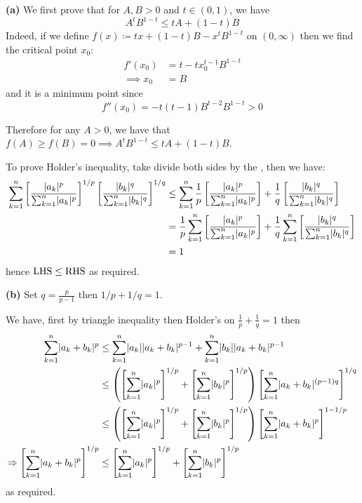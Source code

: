\documentclass[a4paper, 10pt]{article}
\begin{document}
\begin{solution}
    \textbf{(a)} We first prove that for $A, B > 0$ and $t \in (0, 1)$, we have
    \begin{equation*}
        A^t B^{1-t} \leq tA + (1-t) B
        \end{equation*}
        Indeed, if we define $f(x) \coloneqq tx + (1-t) B - x^t B^{1-t}$ on $(0, \infty)$ then we find the critical point $x_0$:
        \begin{align*}
            f'(x_0) &=t - tx_0^{t-1}B^{1-t} \\
            \implies x_0 &= B
        \end{align*}
        and it is a minimum point since
        \begin{equation*}
        f''(x_0) = -t(t-1)B^{t-2}B^{1-t} > 0
        \end{equation*}

        Therefore for any $A > 0$, we have that $f(A) \geq f(B) = 0 \implies A^t B^{1-t} \leq tA + (1-t) B$.

        To prove Holder's inequality, take divide both sides by the \rhs, then we have:
        \begin{align*}
            \sum_{k=1}^{n} \left[\frac{\lvert a_k\rvert^p}{\sum_{k=1}^{n} \lvert a_k\rvert^p}\right]^{1/p}\left[\frac{\lvert b_k\rvert^q}{\sum_{k=1}^{n} \lvert b_k\rvert^q}\right]^{1/q} & \leq \sum_{k=1}^{n} \frac{1}{p} \left[\frac{\lvert a_k\rvert^p}{\sum_{k=1}^{n} \lvert a_k\rvert^p}\right] + \frac{1}{q} \left[\frac{\lvert b_k\rvert^q}{\sum_{k=1}^{n} \lvert b_k\rvert^q}\right] \\
            &= \frac{1}{p} \sum_{k=1}^{n} \left[\frac{\lvert a_k\rvert^p}{\sum_{k=1}^{n} \lvert a_k\rvert^p}\right] + \frac{1}{q} \sum_{k=1}^{n} \left[\frac{\lvert b_k\rvert^q}{\sum_{k=1}^{n} \lvert b_k\rvert^q}\right] \\
            &= 1
        \end{align*}
        hence $\mathrm{LHS} \leq \mathrm{RHS}$ as required.

        \textbf{(b)} Set $q = \frac{p}{p-1}$ then $1/p + 1/q = 1$.

        We have, first by triangle inequality then Holder's on $\frac{1}{p} + \frac{1}{q} = 1$ then
        \begin{align*}
            \sum_{k=1}^{n} \lvert a_k + b_k\rvert^p &\leq \sum_{k=1}^{n} \lvert a_k\rvert \lvert a_k + b_k\rvert^{p-1} + \sum_{k=1}^{n} \lvert b_k\rvert \lvert a_k + b_k\rvert^{p-1} \\
            &\leq \left(\left[\sum_{k=1}^{n} \lvert a_k\rvert^p\right]^{1/p} + \left[\sum_{k=1}^{n} \lvert b_k\rvert^p\right]^{1/p}\right) \left[\sum_{k=1}^{n} \lvert a_k + b_k\rvert^{(p-1)q}\right]^{1/q} \\
            &\leq \left(\left[\sum_{k=1}^{n} \lvert a_k\rvert^p\right]^{1/p} + \left[\sum_{k=1}^{n} \lvert b_k\rvert^p\right]^{1/p}\right) \left[\sum_{k=1}^{n} \lvert a_k + b_k\rvert^p\right]^{1 - 1/p} \\
            \Rightarrow \left[\sum_{k=1}^{n} \lvert a_k + b_k\rvert^p\right]^{1/p} &\leq \left[\sum_{k=1}^{n} \lvert a_k\rvert^p\right]^{1/p} + \left[\sum_{k=1}^{n} \lvert b_k\rvert^p\right]^{1/p}
        \end{align*}
        as required.
\end{solution}
\end{document}
